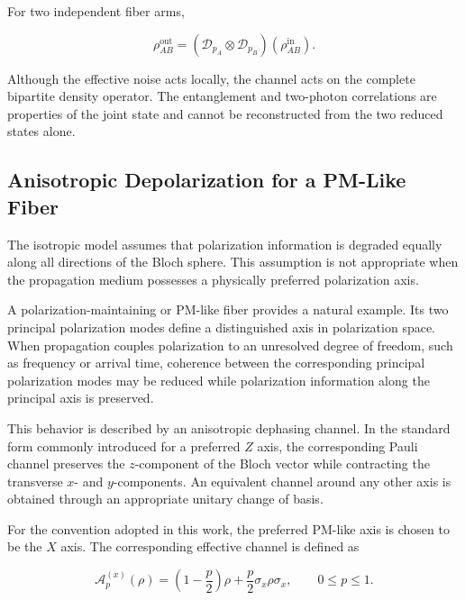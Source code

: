For two independent fiber arms,

\begin{equation}
\rho_{AB}^{\mathrm{out}}
=
\left(
\mathcal{D}_{p_A}
\otimes
\mathcal{D}_{p_B}
\right)
\left(
\rho_{AB}^{\mathrm{in}}
\right).
\label{eq:two_arm_local_depolarizing_channel}
\end{equation}

Although the effective noise acts locally, the channel acts on the complete
bipartite density operator. The entanglement and two-photon correlations are
properties of the joint state and cannot be reconstructed from the two reduced
states alone.


\subsection{Anisotropic Depolarization for a PM-Like Fiber}
\label{subsec:anisotropic_pm_depolarization}

The isotropic model assumes that polarization information is degraded equally
along all directions of the Bloch sphere. This assumption is not appropriate when
the propagation medium possesses a physically preferred polarization axis.

A polarization-maintaining or PM-like fiber provides a natural example. Its two
principal polarization modes define a distinguished axis in polarization space.
When propagation couples polarization to an unresolved degree of freedom, such as
frequency or arrival time, coherence between the corresponding principal
polarization modes may be reduced while polarization information along the
principal axis is preserved.

This behavior is described by an anisotropic dephasing channel. In the standard
form commonly introduced for a preferred \(Z\) axis, the corresponding Pauli
channel preserves the \(z\)-component of the Bloch vector while contracting the
transverse \(x\)- and \(y\)-components. An equivalent channel around any other
axis is obtained through an appropriate unitary change of basis.

For the convention adopted in this work, the preferred PM-like axis is chosen to
be the \(X\) axis. The corresponding effective channel is defined as

\begin{equation}
\mathcal{A}^{(x)}_{p}(\rho)
=
\left(
1-\frac{p}{2}
\right)\rho
+
\frac{p}{2}
\sigma_x\rho\sigma_x,
\qquad
0\leq p\leq1.
\label{eq:anisotropic_x_depolarizing_channel}
\end{equation}

